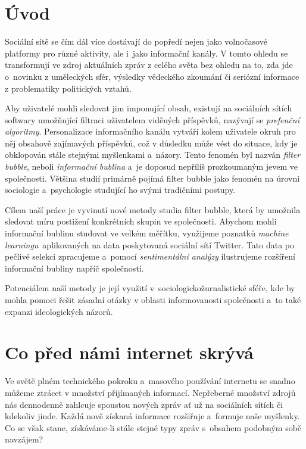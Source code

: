 \documentclass[12pt, a4paper]{article}
\numberwithin{equation}{section} 	%
\begin{document}

\newpage
\section*{Úvod}
\noindent Sociální sítě se čím dál více dostávají do popředí nejen jako volnočasové platformy pro různé aktivity, ale i~jako informační kanály. V tomto ohledu se transformují ve zdroj aktuálních zpráv z celého světa bez ohledu na to, zda jde o~novinku z uměleckých sfér, výsledky vědeckého zkoumání či seriózní informace z problematiky politických vztahů.

Aby uživatelé mohli sledovat jim imponující obsah, existují na sociálních sítích softwary umožňující filtraci uživatelem viděných příspěvků, nazývají se \textit{prefenční algoritmy}. Personalizace informačního kanálu vytváří kolem uživatele okruh pro něj obsahově zajímavých příspěvků, což v důsledku může vést do situace, kdy je obklopován stále stejnými myšlenkami a~názory. Tento fenomén byl nazván \textit{filter bubble}, neboli \textit{informační bublina} a~je doposud nepříliš prozkoumaným jevem ve společnosti. Většina studií primárně pojímá filter bubble jako fenomén na úrovni sociologie a~psychologie studující ho svými tradičními postupy.

Cílem naší práce je vyvinutí nové metody studia filter bubble, která by u\-mož\-ni\-la sledovat míru postižení konkrétních skupin ve společnosti. Abychom mohli informační bublinu studovat ve velkém měřítku, využijeme poznatků \textit{machine learningu}~aplikovaných na data poskytovaná sociální sítí Twitter. Tato data po pečlivé selekci zpracujeme a~pomocí \textit{sentimentální analýzy} ilustrujeme rozšíření informační bubliny napříč společností.

Potenciálem naší metody je její využití v sociologickožurnalistické sféře, kde by mohla pomoci řešit zásadní otázky v oblasti informovanosti společnosti a~to také expanzi ideologických názorů.

\newpage
\section{Co před námi internet skrývá}
\noindent  Ve světě plném technického pokroku a~masového používání internetu se snadno můžeme ztrácet v množství přijímaných informací. Nepřeberné množství zdrojů nás dennodenně zahlcuje spoustou nových zpráv ať už na sociálních sítích či kdekoliv jinde. Každá nově získaná informace rozšiřuje a~formuje naše myšlenky. Co se však stane, získáváme-li stále stejné typy zpráv s obsahem podobným sobě navzájem?
\end{document}

